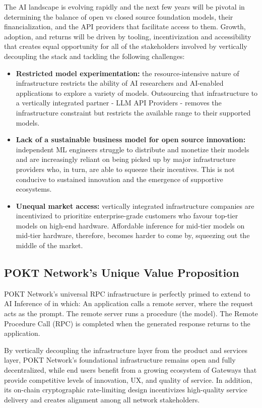 \documentclass[conference,compsoc]{IEEEtran}
\begin{document}
The AI landscape is evolving rapidly and the next few years will be pivotal in determining the balance of open vs closed source foundation models, their financialization, and the API providers that facilitate access to them. Growth, adoption, and returns will be driven by tooling, incentivization and accessibility that creates equal opportunity for all of the stakeholders involved by vertically decoupling the stack and tackling the following challenges:
\begin{itemize}
    \item \textbf{Restricted model experimentation:} the resource-intensive nature of infrastructure restricts the ability of AI researchers and AI-enabled applications to explore a variety of models. Outsourcing that infrastructure to a vertically integrated partner - LLM API Providers - removes the infrastructure constraint but restricts the available range to their supported models.
    \item \textbf{Lack of a sustainable business model for open source innovation:} independent ML engineers struggle to distribute and monetize their models and are increasingly reliant on being picked up by major infrastructure providers who, in turn, are able to squeeze their incentives. This is not conducive to sustained innovation and the emergence of supportive ecosystems.
    \item \textbf{Unequal market access:} vertically integrated infrastructure companies are incentivized to prioritize enterprise-grade customers who favour top-tier models on high-end hardware. Affordable inference for mid-tier models on mid-tier hardware, therefore, becomes harder to come by, squeezing out the middle of the market.
\end{itemize}

\subsection{POKT Network’s Unique Value Proposition}

POKT Network’s universal RPC infrastructure is perfectly primed to extend to AI Inference of in which:
An application calls a remote server, where the request acts as the prompt.
The remote server runs a procedure (the model).
The Remote Procedure Call (RPC) is completed when the generated response returns to the application.

By vertically decoupling the infrastructure layer from the product and services layer, POKT Network’s foundational infrastructure remains open and fully decentralized, while end users benefit from a growing ecosystem of Gateways that provide competitive levels of innovation, UX, and quality of service. In addition, its on-chain cryptographic rate-limiting design incentivizes high-quality service delivery and creates alignment among all network stakeholders.
\end{document}

